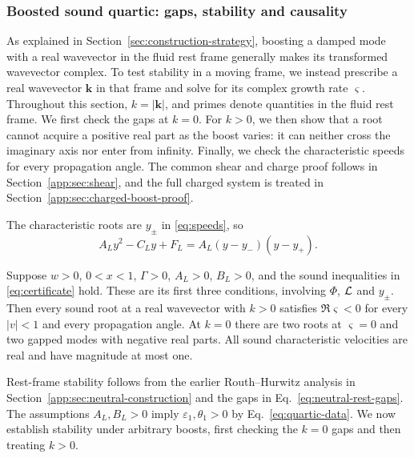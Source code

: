 \subsubsection{Boosted sound quartic: gaps, stability and causality}
\label{app:sec:neutral-criterion}\label{sec:boosts}
As explained in Section~\ref{sec:construction-strategy}, boosting a
damped mode with a real wavevector in the fluid rest frame generally
makes its transformed wavevector complex. To test stability in a moving
frame, we instead prescribe a real wavevector $\boldsymbol k$ in that
frame and solve for its complex growth rate $\varsigma$. Throughout this
section, $k=|\boldsymbol k|$, and primes denote quantities in the fluid
rest frame. We first check the gaps at $k=0$. For $k>0$, we then show that a root
cannot acquire a positive real part as the boost varies: it can neither
cross the imaginary axis nor enter from infinity. Finally, we check the
characteristic speeds for every propagation angle. The common shear and charge
proof follows in Section~\ref{app:sec:shear}, and the full charged system
is treated in Section~\ref{app:sec:charged-boost-proof}.

The characteristic roots are $y_\pm$ in \eqref{eq:speeds}, so
\begin{equation}\label{app:eq:neutral-principal}
 A_Ly^2-C_Ly+F_L=A_L(y-y_-)(y-y_+).
\end{equation}
\begin{proposition}\label{app:prop:neutral}
Suppose $w>0$, $0<x<1$, $\Gamma>0$, $A_L>0$, $B_L>0$, and the
sound inequalities in \eqref{eq:certificate} hold. These are its first
three conditions, involving $\Phi$, $\mathcal L$ and $y_\pm$.
Then every sound root at a real wavevector with $k>0$ satisfies $\Re \varsigma<0$
for every $|v|<1$ and every propagation angle. At $k=0$ there are
two roots at $\varsigma=0$ and two gapped modes with negative real parts. All sound
characteristic velocities are real and have magnitude at most one.
\end{proposition}

Rest-frame stability follows from the earlier Routh--Hurwitz analysis
in Section~\ref{app:sec:neutral-construction} and the gaps in
Eq.~\eqref{eq:neutral-rest-gaps}. The assumptions $A_L,B_L>0$ imply
$\varepsilon_1,\theta_1>0$ by Eq.~\eqref{eq:quartic-data}. We now
establish stability under arbitrary boosts, first checking the $k=0$
gaps and then treating $k>0$.

